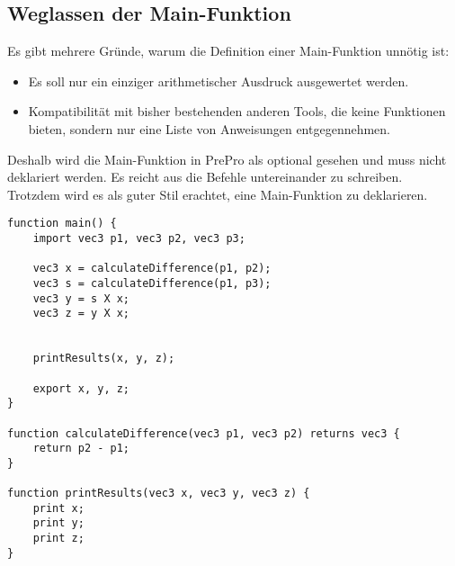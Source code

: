 \subsection{Weglassen der Main-Funktion}
Es gibt mehrere Gründe, warum die Definition einer Main-Funktion unnötig ist:
\begin{itemize}
\item Es soll nur ein einziger arithmetischer Ausdruck ausgewertet werden.
\item Kompatibilität mit bisher bestehenden anderen Tools, die keine Funktionen bieten, sondern nur eine Liste von Anweisungen entgegennehmen.
\end{itemize}
Deshalb wird die Main-Funktion in PrePro als optional gesehen und muss nicht deklariert werden.
Es reicht aus die Befehle untereinander zu schreiben.\\
Trotzdem wird es als guter Stil erachtet, eine Main-Funktion zu deklarieren.

\begin{lstlisting}[language=prepro, label={lst:Bsp_Funktionen}, caption={Beispiel Funktionen}, captionpos=b]
function main() {
	import vec3 p1, vec3 p2, vec3 p3;

	vec3 x = calculateDifference(p1, p2);
	vec3 s = calculateDifference(p1, p3);
	vec3 y = s X x;
	vec3 z = y X x;


	printResults(x, y, z);

	export x, y, z;
}

function calculateDifference(vec3 p1, vec3 p2) returns vec3 {
	return p2 - p1;
}

function printResults(vec3 x, vec3 y, vec3 z) {
	print x;
	print y;
	print z;
}
\end{lstlisting}

